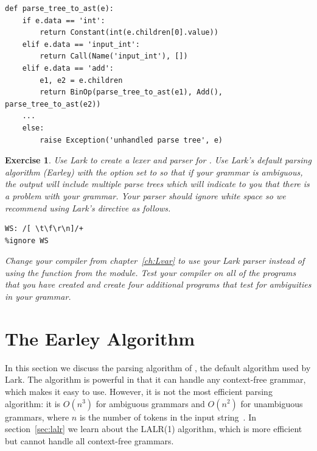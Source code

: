 \documentclass[7x10]{TimesAPriori_MIT}%
\newtheorem{exercise}[theorem]{Exercise}
\numberwithin{theorem}{chapter}
\numberwithin{definition}{chapter}
\numberwithin{equation}{chapter}
\begin{document}
{\begin{center}
\begin{minipage}{0.95\textwidth}
\begin{lstlisting}
def parse_tree_to_ast(e):
    if e.data == 'int':
        return Constant(int(e.children[0].value))
    elif e.data == 'input_int':
        return Call(Name('input_int'), [])
    elif e.data == 'add':
        e1, e2 = e.children
        return BinOp(parse_tree_to_ast(e1), Add(), parse_tree_to_ast(e2))
    ...
    else:
        raise Exception('unhandled parse tree', e)
\end{lstlisting}
\end{minipage}
\end{center}

\begin{exercise}
  \normalfont\normalsize
%
  Use Lark to create a lexer and parser for \LangVar{}.  Use Lark's
  default parsing algorithm (Earley) with the  option
  set to  so that if your grammar is ambiguous, the
  output will include multiple parse trees which will indicate to you
  that there is a problem with your grammar. Your parser should ignore
  white space so we recommend using Lark's  directive
  as follows.
\begin{lstlisting}
WS: /[ \t\f\r\n]/+
%ignore WS
\end{lstlisting}
Change your compiler from chapter~\ref{ch:Lvar} to use your
Lark parser instead of using the  function from
the  module. Test your compiler on all of the \LangVar{}
programs that you have created and create four additional programs
that test for ambiguities in your grammar.
\end{exercise}


\section{The Earley Algorithm}
\label{sec:earley}

In this section we discuss the parsing algorithm of
\citet{Earley:1970ly}, the default algorithm used by Lark.  The
algorithm is powerful in that it can handle any context-free grammar,
which makes it easy to use. However, it is not the most efficient
parsing algorithm: it is $O(n^3)$ for ambiguous grammars and $O(n^2)$
for unambiguous grammars, where $n$ is the number of tokens in the
input string~\citep{Hopcroft06:_automata}.  In section~\ref{sec:lalr}
we learn about the LALR(1) algorithm, which is more efficient but
cannot handle all context-free grammars.

}
\end{document}
